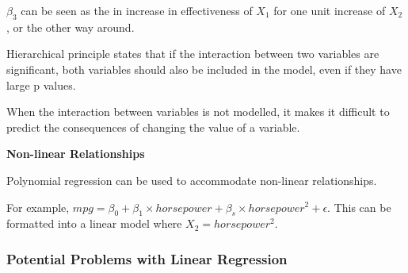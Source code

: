 \documentclass[
]{article}
\begin{document}
\(\beta_3\) can be seen as the in increase in effectiveness of \(X_1\)
for one unit increase of \(X_2\), or the other way around.

Hierarchical principle states that if the interaction between two
variables are significant, both variables should also be included in the
model, even if they have large p values.

When the interaction between variables is not modelled, it makes it
difficult to predict the consequences of changing the value of a
variable.

\textbf{Non-linear Relationships}

Polynomial regression can be used to accommodate non-linear
relationships.

For example,
\(mpg = \beta_0 + \beta_1 \times horsepower + \beta_s \times horsepower^2 + \epsilon\).
This can be formatted into a linear model where \(X_2 = horsepower^2\).

\hypertarget{header-n101}{%
\subsubsection{Potential Problems with Linear
Regression}\label{header-n101}}
\end{document}
